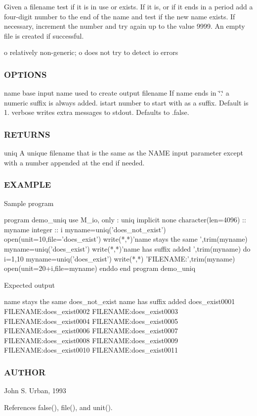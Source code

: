Given a filename test if it is in use or exists. If it is, or if it ends in a period add a four-\/digit number to the end of the name and test if the new name exists. If necessary, increment the number and try again up to the value 9999. An empty file is created if successful.

o relatively non-\/generic; o does not try to detect io errors

\subsubsection*{O\+P\+T\+I\+O\+NS}

name base input name used to create output filename If name ends in \char`\"{}.\char`\"{} a numeric suffix is always added. istart number to start with as a suffix. Default is 1. verbose writes extra messages to stdout. Defaults to .false. \subsubsection*{R\+E\+T\+U\+R\+NS}

uniq A unique filename that is the same as the N\+A\+ME input parameter except with a number appended at the end if needed. \subsubsection*{E\+X\+A\+M\+P\+LE}

\begin{DoxyVerb}Sample program

   program demo_uniq
   use M_io, only : uniq
   implicit none
   character(len=4096) :: myname
   integer            :: i
      myname=uniq('does_not_exist')
      open(unit=10,file='does_exist')
      write(*,*)'name stays the same ',trim(myname)
      myname=uniq('does_exist')
      write(*,*)'name has suffix added ',trim(myname)
      do i=1,10
         myname=uniq('does_exist')
         write(*,*) 'FILENAME:',trim(myname)
         open(unit=20+i,file=myname)
      enddo
   end program demo_uniq

Expected output

 name stays the same does_not_exist
 name has suffix added does_exist0001
 FILENAME:does_exist0002
 FILENAME:does_exist0003
 FILENAME:does_exist0004
 FILENAME:does_exist0005
 FILENAME:does_exist0006
 FILENAME:does_exist0007
 FILENAME:does_exist0008
 FILENAME:does_exist0009
 FILENAME:does_exist0010
 FILENAME:does_exist0011
\end{DoxyVerb}


\subsubsection*{A\+U\+T\+H\+OR}

John S. Urban, 1993 

References false(), file(), and unit().

